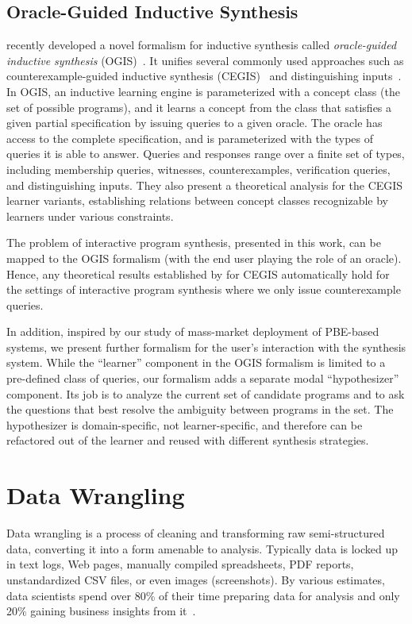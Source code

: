 \subsection{Oracle-Guided Inductive Synthesis}
\citeauthor{ogis} recently developed a novel formalism for inductive synthesis called \emph{oracle-guided inductive
synthesis} (OGIS)~\cite{ogis}.
It unifies several commonly used approaches such as counterexample-guided inductive synthesis (CEGIS)~\cite{sketch} and
distinguishing inputs~\cite{bitvectors}.
In OGIS, an inductive learning engine is parameterized with a concept class (the set of possible programs), and it
learns a concept from the class that satisfies a given partial specification by issuing queries to a given oracle.
The oracle has access to the complete specification, and is parameterized with the types of queries it is able to
answer.
Queries and responses range over a finite set of types, including membership queries, witnesses, counterexamples,
verification queries, and distinguishing inputs.
They also present a theoretical analysis for the CEGIS learner variants, establishing relations between concept classes
recognizable by learners under various constraints.

The problem of interactive program synthesis, presented in this work, can be mapped to the OGIS formalism (with the end
user playing the role of an oracle).
Hence, any theoretical results established by \citeauthor{ogis} for CEGIS automatically hold for the settings of
interactive program synthesis where we only issue counterexample queries.

In addition, inspired by our study of mass-market deployment of PBE-based systems, we present further formalism for the
user's interaction with the synthesis system.
While the ``learner'' component in the OGIS formalism is limited to a pre-defined class of queries, our formalism adds a
separate modal ``hypothesizer'' component.
Its job is to analyze the current set of candidate programs and to ask the questions that best resolve the ambiguity
between programs in the set.
The hypothesizer is domain-specific, not learner-specific, and therefore can be refactored out of the learner and
reused with different synthesis strategies.

\section{Data Wrangling}

Data wrangling is a process of cleaning and transforming raw semi-structured data, converting it into a form amenable to
analysis.
Typically data is locked up in text logs, Web pages, manually compiled spreadsheets, PDF reports, unstandardized CSV
files, or even images (screenshots).
By various estimates, data scientists spend over 80\% of their time preparing data for analysis and only 20\% gaining
business insights from it~\cite{kandel2012enterprise}.

